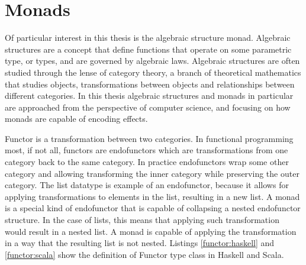 






\section{Monads} \label{monads}
Of particular interest in this thesis is the algebraic structure monad. Algebraic structures are a concept that define functions that operate on some parametric type, or types, and are governed by algebraic laws. Algebraic structures are often studied through the lense of category theory, a branch of theoretical mathematics that studies objects, transformations between objects and relationships between different categories. In this thesis algebraic structures and monads in particular are approached from the perspective of computer science, and focusing on how monads are capable of encoding effects.

Functor is a transformation between two categories. In functional programming most, if not all, functors are endofunctors which are transformations from one category back to the same category. In practice endofunctors wrap some other category and allowing transforming the inner category while preserving the outer category. The list datatype is example of an endofunctor, because it allows for applying transformations to elements in the list, resulting in a new list. A monad is a special kind of endofunctor that is capable of collapsing a nested endofunctor structure. In the case of lists, this means that applying such transformation would result in a nested list. A monad is capable of applying the transformation in a way that the resulting list is not nested. Listings \ref{functor:haskell} and \ref{functor:scala} show the definition of Functor type class in Haskell and Scala.

